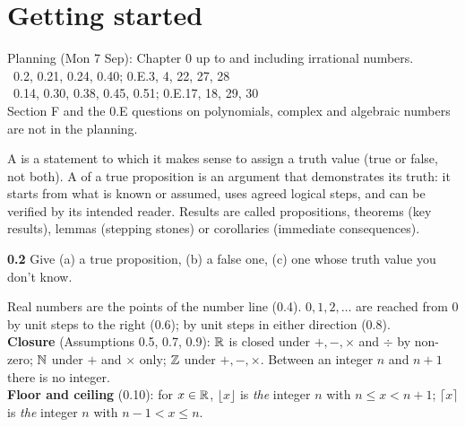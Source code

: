 \setcounter{chapter}{-1}
\chapter{Getting started}
%
{Planning (Mon 7 Sep): Chapter 0 up to and including irrational numbers.\\ \fE\ 0.2, 0.21, 0.24, 0.40; 0.E.3, 4, 22, 27, 28\\ \fR\ 0.14, 0.30, 0.38, 0.45, 0.51; 0.E.17, 18, 29, 30\\ Section F and the 0.E questions on polynomials, complex and algebraic numbers are not in the planning.}


\begin{key}
A  is a statement to which it makes sense to assign a truth value (true or false, not both). A  of a true proposition is an argument that demonstrates its truth: it starts from what is known or assumed, uses agreed logical steps, and can be verified by its intended reader. Results are called propositions, theorems (key results), lemmas (stepping stones) or corollaries (immediate consequences).
\end{key}

\begin{trybox}[{0.2 \fE}]
\textbf{0.2} Give (a) a true proposition, (b) a false one, (c) one whose truth value you don't know.
\end{trybox}

\begin{key}
Real numbers are the points of the number line (0.4).  $0,1,2,\dots$ are reached from $0$ by unit steps to the right (0.6);  by unit steps in either direction (0.8). \\
\textbf{Closure} (Assumptions 0.5, 0.7, 0.9): $\mathbb{R}$ is closed under $+,-,\times$ and $\div$ by non-zero; $\mathbb{N}$ under $+$ and $\times$ only; $\mathbb{Z}$ under $+,-,\times$. Between an integer $n$ and $n+1$ there is no integer.\\
\textbf{Floor and ceiling} (0.10): for $x\in\mathbb{R}$, $\lfloor x\rfloor$ is \emph{the} integer $n$ with $n\le x<n+1$; $\lceil x\rceil$ is \emph{the} integer $n$ with $n-1<x\le n$.
\end{key}

